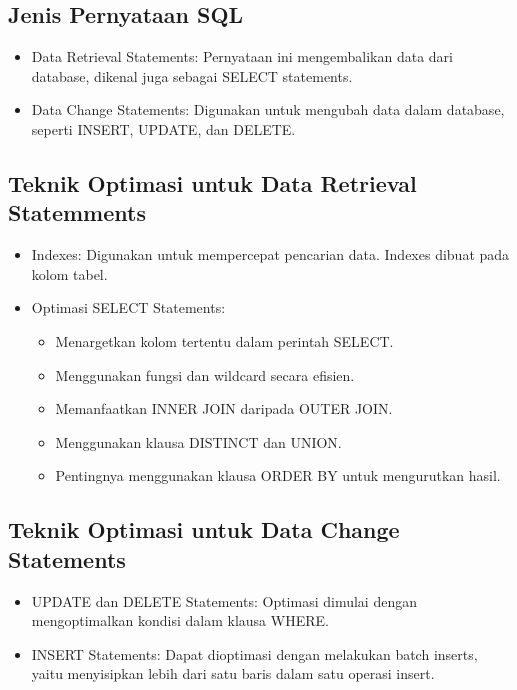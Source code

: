 \documentclass{article}
\begin{document}
\subsection{Jenis Pernyataan SQL}
\begin{itemize}
    \item Data Retrieval Statements: Pernyataan ini mengembalikan data dari database, dikenal juga sebagai SELECT statements.
    \item Data Change Statements: Digunakan untuk mengubah data dalam database, seperti INSERT, UPDATE, dan DELETE.
\end{itemize}

\subsection{Teknik Optimasi untuk Data Retrieval Statemments}
\begin{itemize}
    \item Indexes: Digunakan untuk mempercepat pencarian data. Indexes dibuat pada kolom tabel.
    \item Optimasi SELECT Statements:
          \begin{itemize}
              \item Menargetkan kolom tertentu dalam perintah SELECT.
              \item Menggunakan fungsi dan wildcard secara efisien.
              \item Memanfaatkan INNER JOIN daripada OUTER JOIN.
              \item Menggunakan klausa DISTINCT dan UNION.
              \item Pentingnya menggunakan klausa ORDER BY untuk mengurutkan hasil.
          \end{itemize}
\end{itemize}

\subsection{Teknik Optimasi untuk Data Change Statements}
\begin{itemize}
    \item UPDATE dan DELETE Statements: Optimasi dimulai dengan mengoptimalkan kondisi dalam klausa WHERE.
    \item INSERT Statements: Dapat dioptimasi dengan melakukan batch inserts, yaitu menyisipkan lebih dari satu baris dalam satu operasi insert.
\end{itemize}
\end{document}
